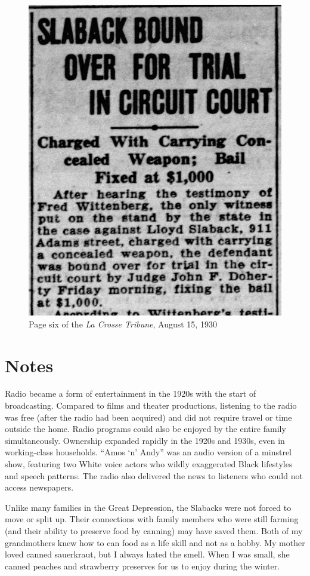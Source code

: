 \documentclass[
  letterpaper,
]{book}
\begin{document}
\begin{figure}[H]

{\centering \includegraphics[width=0.7\linewidth,height=\textheight,keepaspectratio]{images/Akou06.jpg}

}

\caption{Page six of the \emph{La Crosse Tribune}, August 15, 1930}

\end{figure}%

\section{Notes}\label{notes-10}

Radio became a form of entertainment in the 1920s with the start of
broadcasting. Compared to films and theater productions, listening to
the radio was free (after the radio had been acquired) and did not
require travel or time outside the home. Radio programs could also be
enjoyed by the entire family simultaneously. Ownership expanded rapidly
in the 1920s and 1930s, even in working-class households. ``Amos `n'
Andy'' was an audio version of a minstrel show, featuring two White
voice actors who wildly exaggerated Black lifestyles and speech
patterns. The radio also delivered the news to listeners who could not
access newspapers.

Unlike many families in the Great Depression, the Slabacks were not
forced to move or split up. Their connections with family members who
were still farming (and their ability to preserve food by canning) may
have saved them. Both of my grandmothers knew how to can food as a life
skill and not as a hobby. My mother loved canned sauerkraut, but I
always hated the smell. When I was small, she canned peaches and
strawberry preserves for us to enjoy during the winter.
\end{document}
